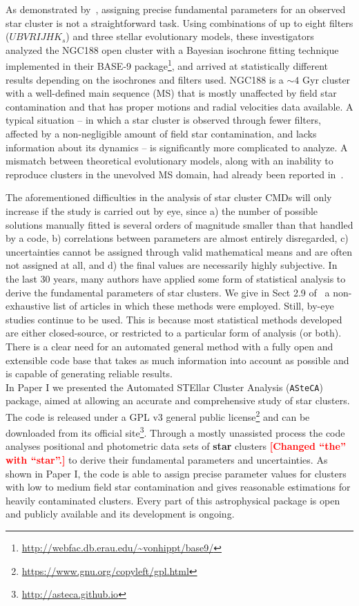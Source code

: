 \documentclass[draft]{aa}
\newcommand{\LEt}[1]{\textcolor{red}{\textbf{[#1]}}}
\begin{document}
As demonstrated by~\cite{Hills_2015}, assigning precise fundamental
parameters for an observed star cluster is not a straightforward task.
Using combinations of up to eight filters ($UBVRIJHK_s$) and three stellar
evolutionary models, these investigators analyzed the NGC188 open cluster with a
Bayesian isochrone fitting technique implemented in their 
BASE-9 package\footnote{\url{http://webfac.db.erau.edu/~vonhippt/base9/}}, and
arrived at statistically different results depending on the isochrones and filters used.
%
NGC188 is a ${\sim}4$ Gyr cluster with a well-defined main sequence (MS) that is mostly
unaffected by field star contamination and that has proper motions and radial
velocities data available.
A typical situation -- in which a star cluster is observed through fewer
filters, affected by a non-negligible amount of field star contamination, and
lacks information about its dynamics -- is significantly more
complicated to analyze.
%
A mismatch between theoretical evolutionary models, along with an
inability to reproduce clusters in the unevolved MS domain, had already
been reported in~\cite{Grocholski_2003}.

The aforementioned difficulties in the analysis of star cluster CMDs will only
increase if the study is carried out by eye, since a) the number of possible solutions
manually fitted is several orders of magnitude smaller than that handled by a
code, b) correlations between parameters are almost entirely disregarded, c)
uncertainties cannot be assigned through valid mathematical
means and are often not assigned at \mbox{all,} and d) the final values
are necessarily highly subjective.
%
In the last 30 years, many authors have applied some form of
statistical analysis to derive the fundamental parameters of star clusters.
We give in Sect 2.9 of~\citet[][hereafter Paper I]{Perren_2015} a non-exhaustive
list of articles in which these methods were employed.
%
Still, by-eye studies continue to be used. This is because most statistical
methods developed are either closed-source, or restricted to a particular form
of analysis (or both).
%
There is a clear need for an automated general method with a fully open
and extensible code base that takes as much information into account as
possible and is capable of generating reliable results.\\

In Paper I we presented the Automated STEllar Cluster Analysis
(\texttt{ASteCA}) package, aimed at allowing an accurate and comprehensive study
of star clusters.
The code is released under a GPL v3 general public
license\footnote{\url{https://www.gnu.org/copyleft/gpl.html}} and
can be downloaded from its official
site\footnote{\url{http://asteca.github.io}}.
%
Through a mostly unassisted process the code analyses positional and photometric
data sets of \textbf{star} clusters \LEt{Changed ``the'' with ``star''.} to
derive their fundamental parameters and uncertainties.
As shown in Paper I, the code is able to assign precise parameter values for
clusters with low to medium field star contamination and gives reasonable
estimations for heavily contaminated clusters. Every part of this astrophysical
package is open and publicly available and its development is ongoing.
\end{document}
